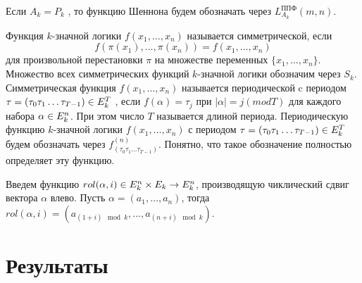\documentclass[a4paper, 12pt]{extarticle}
\def\times{\mathchar8706\nobreak\discretionary{}{\usefont{OMS}{cmsy}{m}{n}\char2}{}}
\def\in{\mathchar"3232\nobreak\discretionary{}{\usefont{OMS}{cmsy}{m}{n}\char50}{}}
\begin{document}
Если $A_k = P_k$ , то функцию Шеннона будем обозначать через $L^{\text{ППФ}}_{A_k}(m, n)$.

Функция $k$\nobreakdash-значной логики $f(x_1 ,\dots , x_n)$ называется симметрической, если
$$f(\pi(x_1), \dots, \pi(x_n)) = f(x_1, \dots, x_n)$$
для произвольной перестановки $\pi$ на множестве переменных $\{x_1 , \dots , x_n \}$.
Множество всех симметрических функций $k$\nobreakdash-значной логики обозначим через $S_k$.
Симметрическая функция $f(x_1, \dots, x_n)$ называется периодической c
периодом $\tau = (\tau_0 \tau_1 \dots \tau_{T-1}) \in E_k^T$ , если $f(\alpha) = \tau_j$ при $|\alpha| = j(mod T)$
для каждого набора $\alpha \in E_k^n$. При этом число $T$ называется длиной периода. Периодическую функцию
$k$\nobreakdash-значной логики $f(x_1 , \dots , x_n)$ с периодом $\tau = (\tau_0 \tau_1 \dots \tau_{T-1}) \in E_k^T$
будем обозначать через $f^{(n)}_{(\tau_0 \tau_1 \dots \tau_{T-1})}$. Понятно, что
такое обозначение полностью определяет эту функцию.

Введем функцию $rol(\alpha, i) \in E_k^n \times E_k \rightarrow E_k^n$, производящую чиклический сдвиг вектора $\alpha$
влево. Пусть $\alpha = (a_1, \dots, a_n)$, тогда $rol(\alpha, i) = (a_{(1+i)\mod k}, \dots, a_{(n+i)\mod k})$.

\section{Результаты}
\end{document}
